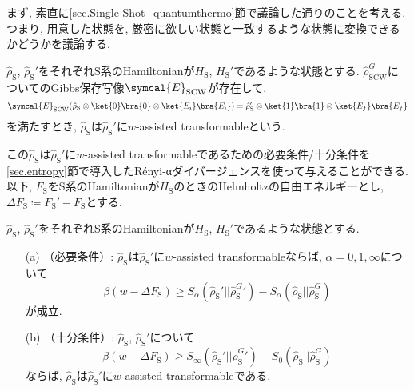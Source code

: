 


まず, 素直に\ref{sec.Single-Shot_quantumthermo}節で議論した通りのことを考える. 
つまり, 用意した状態を, 厳密に欲しい状態と一致するような状態に変換できるかどうかを議論する. 

\begin{mydfn}
  $\hat{\rho}_{\text{S}}$, $\hat{\rho}_{\text{S}}'$をそれぞれS系のHamiltonianが$H_{\text{S}}$, $H_{\text{S}}'$であるような状態とする. 
  $\hat{\rho}_{\text{SCW}}^G$についてのGibbs保存写像$\symcal{E}_{\text{SCW}}$が存在して, 
  \begin{equation}
    \symcal{E}_{\text{SCW}}(\hat{\rho}_{\text{S}}\otimes\ket{0}\bra{0}\otimes\ket{E_i}\bra{E_i})=\hat{\rho}_{\text{S}}'\otimes\ket{1}\bra{1}\otimes\ket{E_f}\bra{E_f}
  \end{equation}
  を満たすとき, $\hat{\rho}_\text{S}$は$\hat{\rho}_\text{S}'$に$w$-assisted transformableという. 
\end{mydfn}

この$\hat{\rho}_\text{S}$は$\hat{\rho}_\text{S}'$に$w$-assisted transformableであるための必要条件/十分条件を\ref{sec.entropy}節で導入したR\'{e}nyi-αダイバージェンスを使って与えることができる. 
以下, $F_{\text{S}}$をS系のHamiltonianが$H_{\text{S}}$のときのHelmholtzの自由エネルギーとし, $\Delta F_{\text{S}}\coloneqq F_{\text{S}}'-F_{\text{S}}$とする. 

\begin{mythm}\label{thm.exact-case_single-shot_work_bounds}
  $\hat{\rho}_{\text{S}}$, $\hat{\rho}_{\text{S}}'$をそれぞれS系のHamiltonianが$H_{\text{S}}$, $H_{\text{S}}'$であるような状態とする. 
  \begin{enumerate}
    \item[(a)]（必要条件）: $\hat{\rho}_\text{S}$は$\hat{\rho}_\text{S}'$に$w$-assisted transformableならば, $\alpha=0, 1, \infty$について
    \begin{equation}
      \beta(w-\Delta F_{\text{S}})\geq S_\alpha (\hat{\rho}_{\text{S}}{}'||\hat{\rho}_{\text{S}}^{G}{}')-S_\alpha (\hat{\rho}_{\text{S}}||\hat{\rho}_{\text{S}}^G)
    \end{equation}
    が成立. 
    \item[(b)]（十分条件）: $\hat{\rho}_{\text{S}}$, $\hat{\rho}_{\text{S}}'$について
    \begin{equation}
      \beta(w-\Delta F_{\text{S}})\geq S_\infty (\hat{\rho}_{\text{S}}{}'||\hat{\rho}_{\text{S}}^{G}{}')-S_0 (\hat{\rho}_{\text{S}}||\hat{\rho}_{\text{S}}^G)
    \end{equation}
    ならば, $\hat{\rho}_\text{S}$は$\hat{\rho}_\text{S}'$に$w$-assisted transformableである. 
  \end{enumerate}
\end{mythm}

